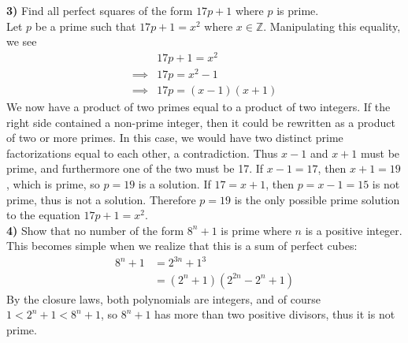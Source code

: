 \documentclass{scrartcl}
\begin{document}
\textbf{3)} Find all perfect squares of the form $17p+1$ where $p$ is prime.\\

Let $p$ be a prime such that $17p+1=x^2$ where $x\in\mathbb{Z}$. Manipulating this equality, we see
\begin{align*}
  &17p+1 = x^2\\
  \implies& 17p = x^2 - 1\\
  \implies& 17p = (x-1)(x+1)
\end{align*}
We now have a product of two primes equal to a product of two integers. If the right side contained a non-prime integer, then it could be rewritten as a product of two or more primes. In this case, we would have two distinct prime factorizations equal to each other, a contradiction. Thus $x-1$ and $x+1$ must be prime, and furthermore one of the two must be 17. If $x-1=17$, then $x+1=19$, which is prime, so $p=19$ is a solution. If $17=x+1$, then $p=x-1=15$ is not prime, thus is not a solution. Therefore $p=19$ is the only possible prime solution to the equation $17p+1=x^2$.\\

\textbf{4)} Show that no number of the form $8^n+1$ is prime where $n$ is a positive integer.\\

This becomes simple when we realize that this is a sum of perfect cubes:
\begin{align*}
  8^n + 1 &= 2^{3n} + 1^3\\
  &= \left(2^n + 1\right)\left(2^{2n} - 2^n + 1\right)
\end{align*}
By the closure laws, both polynomials are integers, and of course $1 < 2^n + 1 < 8^n + 1$, so $8^n+1$ has more than two positive divisors, thus it is not prime.
\end{document}
